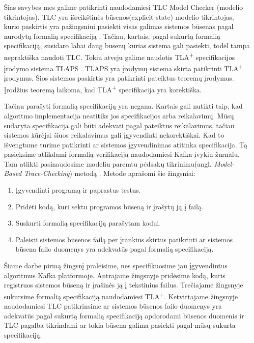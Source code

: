 \documentclass{VUMIFPSmagistrinis}
\begin{document}
	Šias savybes mes galime patikrinti naudodamiesi TLC Model Checker (modelio tikrintojas).
		TLC yra išreikštinės būsenos(explicit-state) modelio tikrintojas, kurio paskirtis yra pažingsniui pasiekti visas galimas sistemos būsenas pagal nurodytą formalią specifikaciją \cite{yu1999model}.
		Tačiau, kartais, pagal sukurtą formalią specifikaciją, susidaro labai daug būsenų kurias sistema gali pasiekti, todėl tampa nepraktiška naudoti TLC.
		Tokiu atveju galime naudotis TLA\textsuperscript{+} specifikacijos įrodymo sistema TLAPS \cite{cousineau2012tla+}.
		TLAPS yra įrodymų sistema skirta patikrinti TLA\textsuperscript{+} įrodymus.
		Šios sistemos paskirtis yra patikrinti pateiktus teoremų įrodymus.
		Įrodžius teoremą laikoma, kad TLA\textsuperscript{+} specifikacija yra korektiška.


		Tačiau parašyti formalią specifikaciją yra negana.
		Kartais gali nutikti taip, kad algoritmo implementacija neatitiks jos specifikacijos arba reikalavimų.
		Mūsų sudaryta specifikacija gali būti adekvati pagal pateiktus reikalavimus, tačiau sistemos kūrėjai šiuos reikalavimus gali įgyvendinti nekorektiškai.
		Kad to išvengtume turime patikrinti ar sistemos įgyvendinimas atitinka specifikacija.
		Tą pasieksime atlikdami formalią verifikaciją naudodamiesi Kafka įvykiu žurnalu.
		Tam atlikti pasinaudosime modeliu paremtu pėdsakų tikrinimu(angl. {\it Model-Based Trace-Checking}) metodą \cite{ltx}.
		Metode aprašomi šie žingsniai:
		\begin{enumerate}
			\item{Įgyvendinti programą ir paprastus testus.}
			\item{Pridėti kodą, kuri sektu programos būseną ir įrašytų ją į failą.}
			\item{Suskurti formalią specifikaciją parašytam kodui.}
			\item{Paleisti sistemos būsenos failą per įrankius skirtus patikrinti ar sistemos būsena failo duomenys yra adekvatūs pagal formalią specifikaciją.}
		\end{enumerate}

		Šiame darbe pirmą žingsnį praleisime, nes specifikuosime jau įgyvendintus algoritmus Kafka platformoje.
		Antrajame žingsnyje pridėsime kodą, kuris registruos sistemos būseną ir įrašinės ją į tekstinius failus.
		Trečiajame žingsnyje sukursime formalią specifikaciją naudodamiesi TLA\textsuperscript{+}.
		Ketvirtajame žingsnyje naudodamiesi TLC patikrinsime ar sistemos būsenos failo duomenys yra adekvatūs pagal sukurtą formalią specifikaciją apdorodami būsenos duomenis ir TLC pagalba tikrindami ar tokia būsena galima pasiekti pagal mūsų sukurta specifikaciją.
\end{document}
